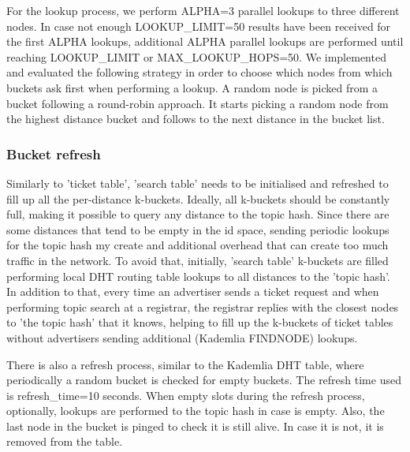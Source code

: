 For the lookup process, we perform ALPHA=3 parallel lookups to three different nodes. In case not enough LOOKUP\_LIMIT=50 results have been received for the first ALPHA lookups, additional ALPHA parallel lookups are performed until reaching LOOKUP\_LIMIT or MAX\_LOOKUP\_HOPS=50. We implemented and evaluated the following strategy in order to choose which nodes from which buckets ask first when performing a lookup. A random node is picked from a bucket following a round-robin approach. It starts picking a random node from the highest distance bucket and follows to the next distance in the bucket list.

\subsubsection{Bucket refresh}

Similarly to 'ticket table', 'search table' needs to be initialised and refreshed to fill up all the per-distance k-buckets. Ideally, all k-buckets should be constantly full, making it possible to query any distance to the topic hash. Since there are some distances that tend to be empty in the id space, sending periodic lookups for the topic hash my create and additional overhead that can create too much traffic in the network. To avoid that, initially, 'search table' k-buckets are filled performing local DHT routing table lookups to all distances to the 'topic hash'. In addition to that, every time an advertiser sends a ticket request and when performing topic search at a registrar, the registrar replies with the closest nodes to 'the topic hash' that it knows, helping to fill up the k-buckets of ticket tables without advertisers sending additional (Kademlia FINDNODE) lookups.

There is also a refresh process, similar to the Kademlia DHT table, where periodically a random bucket is checked for empty buckets. The refresh time used is refresh\_time=10 seconds. When empty slots during the refresh process, optionally, lookups are performed to the topic hash in case is empty. Also, the last node in the bucket is pinged to check it is still alive. In case it is not, it is removed from the table.



